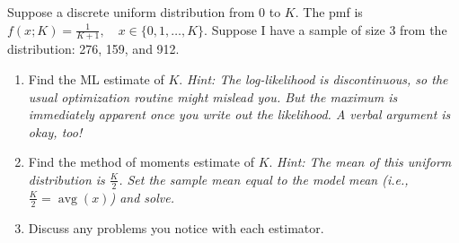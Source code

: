 \documentclass[border=3bp]{standalone}
\begin{document}
\begin{minipage}{3.5in}
Suppose a discrete uniform distribution from $0$ to $K$. The pmf is $f(x; K) = \frac{1}{K + 1}, \quad x \in \{0, 1, \ldots, K\}.$
Suppose I have a sample of size 3 from the distribution: 276, 159, and 912.

\begin{enumerate}
\item Find the ML estimate of $K$. \textit{Hint: The log-likelihood is discontinuous, so the usual optimization routine might mislead you. But the maximum is immediately apparent once you write out the likelihood. A verbal argument is okay, too!}

\item Find the method of moments estimate of $K$. \textit{Hint: The mean of this uniform distribution is $\tfrac{K}{2}$. Set the sample mean equal to the model mean (i.e., $\tfrac{K}{2} = \operatorname{avg}(x)$) and solve.}

\item Discuss any problems you notice with each estimator.
\end{enumerate}
\end{minipage}
\end{document}
